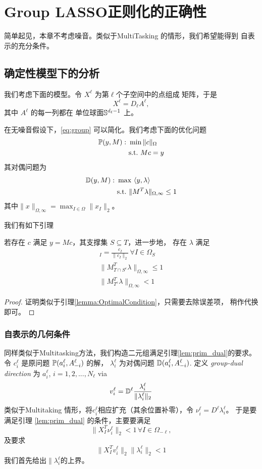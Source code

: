 \documentclass[main.tex]{subfiles}
\begin{document}
\chapter{Group LASSO正则化的正确性}\label{chp:proof_group}
简单起见，本章不考虑噪音。类似于MultiTasking 的情形，我们希望能得到
自表示的充分条件。

\section{确定性模型下的分析}
我们考虑下面的模型。令 $X^\ell$ 为第$\ell$个子空间中的点组成
矩阵，于是
$$ X^\ell = D_\ell A^{\ell} ,$$ 
其中 $A^\ell$ 的每一列都在 单位球面$\S^{d_\ell-1}$ 上。

在无噪音假设下，\ref{eq:group} 可以简化。我们考虑下面的优化问题
\begin{align}
  \P(y,M): \,\, & \min \| c\|_{\Omega} \\
                & \mbox{s.t.}\,\, Mc = y
  \label{eq:group_primal}
\end{align}
其对偶问题为 
\begin{align}
  \D(y,M): \,\, &\max \,\, \langle y, \lambda\rangle \\
                & \mbox{s.t.}\,\, \|M^T\lambda\|_{\Omega,\infty} \leq 1
\end{align}
其中$\|x\|_{\Omega, \infty} = \max_{I \in \Omega} \|x_I\|_2$。

我们有如下引理 
\begin{lemma}
  \label{lem:prim_dual}
  若存在 $c$ 满足 $y = Mc$，其支撑集 $S \subseteq T$，进一步地，
  存在 $\lambda$ 满足
  \begin{align*}
    [M_{S}^T \lambda]_I = \frac{c_I}{\|c_I\|_2} \, \forall I \in \Omega_S\\
    \|M_{T\cap S^c}^T \lambda\|_{\Omega,\infty} \leq 1 \\
    \|M_{T^c}^T \lambda\|_{\Omega,\infty} < 1
  \end{align*}
\end{lemma}
\begin{proof}
  证明类似于引理\ref{lemma:OptimalCondition}，只需要去除误差项，
  稍作代换即可。
\end{proof}

\subsection{自表示的几何条件}
同样类似于Multitasking方法，我们构造二元组满足引理\ref{lem:prim_dual}的要求。
令 $c_{i}^{\ell}$ 是原问题 $\P(a_i^{\ell}, A_{-i}^{\ell})$ 的解，
$\lambda_i^{\ell}$ 为对偶问题 $\D(a_{i}^{\ell}, A_{-i}^{\ell})$.
定义 \emph{group-dual direction} 为 $a_{i}^{\ell}$, $i = 1,2,...,N_\ell$ via 
$$ v_i^\ell = \D^{\ell} \frac{\lambda_i^\ell}{\|\lambda_i^\ell \|_2} $$
类似于Multitaking 情形，将$c_i^{\ell}$相应扩充（其余位置补零），令 $\nu_i^\ell
= D^{\ell} \lambda_i^\ell$。 于是要满足引理 \ref{lem:prim_dual}
的条件，主要要满足 
$$ \| X^T_I \nu_i^\ell\|_2 < 1 \, \forall I \in \Omega_{-\ell},$$
及要求
$$\| X^T_I v_i^\ell\|_2 \|\lambda_i^\ell\|_2 < 1$$
我们首先给出$\|\lambda_i^\ell$的上界。
\end{document}
